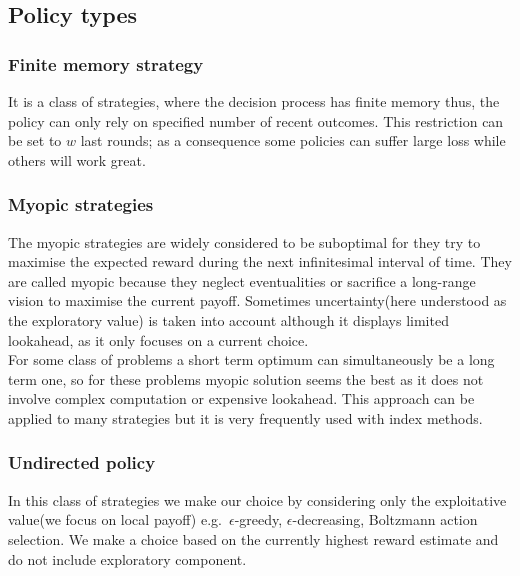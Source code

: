 \documentclass[12pt, a4paper, pdflatex, leqno, twoside]{report}
\begin{document}
\subsection{Policy types}


\subsubsection{Finite memory strategy}
It is a class of strategies, where the decision process has finite memory thus, the policy can only rely on specified number of recent outcomes. This restriction can be set to $w$ last rounds; 
as a consequence some policies can suffer large loss while others will work great.\\

\subsubsection{Myopic strategies}
The myopic strategies are widely considered to be suboptimal for they try to maximise the expected 
reward during the next infinitesimal interval of time. They are called myopic 
because they neglect eventualities or sacrifice a long-range 
vision to maximise the current payoff. Sometimes uncertainty(here understood as the exploratory value) is taken 
into account although it displays limited lookahead, as it only focuses on a current choice.\\

For some class of problems a short term optimum can
simultaneously be a long term one, so for these problems myopic solution
seems the best as it does not involve complex computation or expensive 
lookahead. This approach can be applied to many strategies but it is very frequently 
used with index methods.\\

\subsubsection{Undirected policy}    
In this class of strategies we make our choice by considering only the exploitative 
value(we focus on local payoff) e.g.\ $\epsilon$-greedy, $\epsilon$-decreasing, Boltzmann action 
selection. We make a choice based on the currently highest reward estimate and
do not include exploratory component.\\
\end{document}

